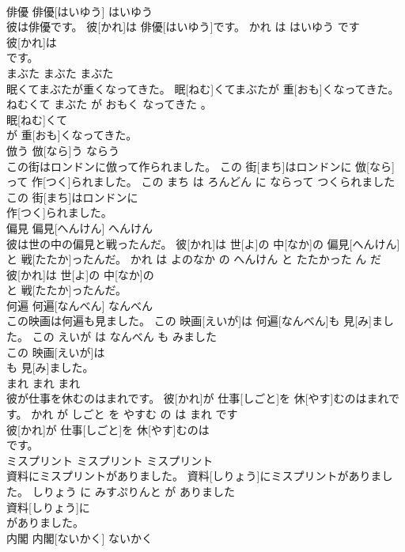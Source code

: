 \documentclass[8pt]{extreport}
\begin{document}
\begin{CJK}{UTF8}{min}
\\	俳優	俳優[はいゆう]	はいゆう	
\\	彼は俳優です。	彼[かれ]は 俳優[はいゆう]です。	かれ は はいゆう です	
\\	彼[かれ]は
\\	です。			
\\	まぶた	まぶた	まぶた	
\\	眠くてまぶたが重くなってきた。	眠[ねむ]くてまぶたが 重[おも]くなってきた。	ねむくて まぶた が おもく なってきた 。	
\\	眠[ねむ]くて
\\	が 重[おも]くなってきた。			
\\	倣う	倣[なら]う	ならう	
\\	この街はロンドンに倣って作られました。	この 街[まち]はロンドンに 倣[なら]って 作[つく]られました。	この まち は ろんどん に ならって つくられました	
\\	この 街[まち]はロンドンに
\\	作[つく]られました。			
\\	偏見	偏見[へんけん]	へんけん	
\\	彼は世の中の偏見と戦ったんだ。	彼[かれ]は 世[よ]の 中[なか]の 偏見[へんけん]と 戦[たたか]ったんだ。	かれ は よのなか の へんけん と たたかった ん だ	
\\	彼[かれ]は 世[よ]の 中[なか]の
\\	と 戦[たたか]ったんだ。			
\\	何遍	何遍[なんべん]	なんべん	
\\	この映画は何遍も見ました。	この 映画[えいが]は 何遍[なんべん]も 見[み]ました。	この えいが は なんべん も みました	
\\	この 映画[えいが]は
\\	も 見[み]ました。			
\\	まれ	まれ	まれ	
\\	彼が仕事を休むのはまれです。	彼[かれ]が 仕事[しごと]を 休[やす]むのはまれです。	かれ が しごと を やすむ の は まれ です	
\\	彼[かれ]が 仕事[しごと]を 休[やす]むのは
\\	です。			
\\	ミスプリント	ミスプリント	ミスプリント	
\\	資料にミスプリントがありました。	資料[しりょう]にミスプリントがありました。	しりょう に みすぷりんと が ありました	
\\	資料[しりょう]に
\\	がありました。			
\\	内閣	内閣[ないかく]	ないかく	

\end{CJK}
\end{document}

